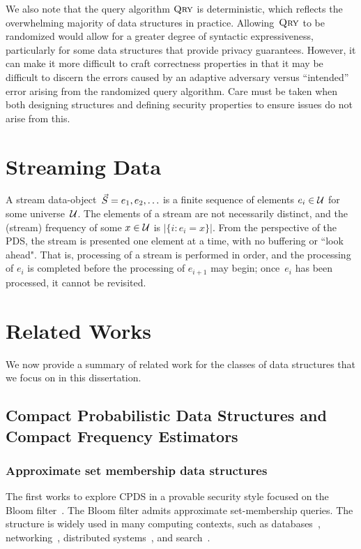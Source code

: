 We also note that the query algorithm $\textnormal{\textsc{Qry}}$ is deterministic, which reflects the overwhelming majority of data structures in practice. Allowing~$\textnormal{\textsc{Qry}}$ to be randomized would allow for a greater degree of syntactic expressiveness, particularly for some data structures that provide privacy guarantees. However, it can make it more difficult to craft correctness properties in that it may be difficult to discern the errors caused by an adaptive adversary versus ``intended'' error arising from the randomized query algorithm. Care must be taken when both designing structures and defining security properties to ensure issues do not arise from this.  

\section{Streaming Data}

A stream data-object~$\vec{S} = e_1,e_2,\ldots$ is a finite sequence of elements $e_i \in \mathcal{U}$ for some universe~$\mathcal{U}$.  
The elements of a stream are not necessarily distinct, and the (stream) frequency of some $x \in \mathcal{U}$ is $|\{i: e_i=x \}|$.  
From the perspective of the PDS, the stream is presented one element at a time, with no buffering or ``look ahead".  
That is, processing of a stream is performed in order, and the processing of $e_i$ is completed before the processing of $e_{i+1}$ may begin; once~$e_i$ has been processed, it cannot be revisited.

\section{Related Works}

We now provide a summary of related work for the classes of data structures that we focus on in this dissertation.

\subsection{Compact Probabilistic Data Structures and Compact Frequency Estimators}

\subsubsection{Approximate set membership data structures}

The first works to explore CPDS in a provable security style focused on the Bloom filter~\cite{bloom1970space}. The Bloom filter admits approximate set-membership queries. The structure is widely used in many computing contexts, such as databases~\cite{chang2008bigtable}, networking~\cite{broder2004network}, distributed systems~\cite{tarkoma2011theory}, and search~\cite{goodwin2017bitfunnel}. 

